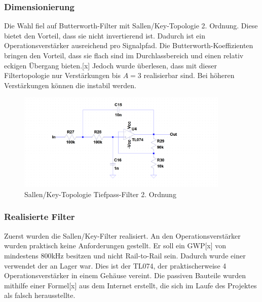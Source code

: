 \subsubsection*{Dimensionierung}

\begin{minipage}[h]{0.5\textwidth}
Die Wahl fiel auf Butterworth-Filter mit Sallen/Key-Topologie 2. Ordnung. Diese bietet den Vorteil, dass sie nicht invertierend ist. Dadurch ist ein Operationsverstärker ausreichend pro Signalpfad. Die Butterworth-Koeffizienten bringen den Vorteil, dass sie flach sind im Durchlassbereich und einen relativ eckigen Übergang bieten.[x] Jedoch wurde überlesen, dass mit dieser Filtertopologie nur Verstärkungen bis $A=3$ realisierbar sind. Bei höheren Verstärkungen können die instabil werden. 
\end{minipage}
\begin{minipage}[h]{0.5\textwidth} 
\begin{figure}[H]
\begin{center}
\includegraphics[width=0.9\textwidth]{images/Analoge_Schaltung_Sallen.png}
\caption{Sallen/Key-Topologie Tiefpass-Filter 2. Ordnung}
\end{center}
\end{figure}
\end{minipage}


\subsubsection*{Realisierte Filter}
Zuerst wurden die Sallen/Key-Filter realisiert. An den Operationsverstärker wurden praktisch keine Anforderungen gestellt. Er soll ein GWP[x] von mindestens 800kHz besitzen und nicht Rail-to-Rail sein. Dadurch wurde einer verwendet der an Lager war. Dies ist der TL074, der praktischerweise 4 Operationsverstärker in einem Gehäuse vereint. Die passiven Bauteile wurden mithilfe einer Formel[x] aus dem Internet erstellt, die sich im Laufe des Projektes als falsch herausstellte.


